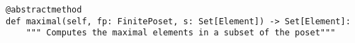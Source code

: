 \begin{verbatim}
@abstractmethod
def maximal(self, fp: FinitePoset, s: Set[Element]) -> Set[Element]:
    """ Computes the maximal elements in a subset of the poset"""
\end{verbatim}